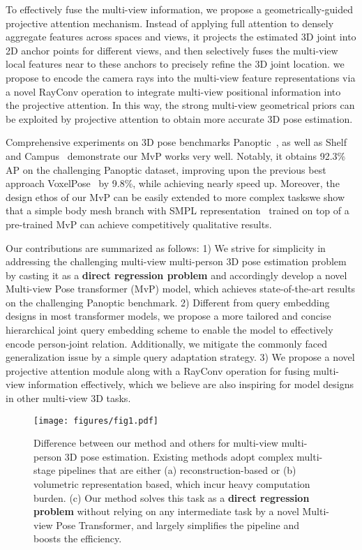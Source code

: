 \documentclass{article}
\begin{document}
To effectively fuse the multi-view information, we propose a geometrically-guided projective attention mechanism. Instead of applying full attention to densely aggregate features {across spaces and views},   
{it projects the estimated 3D  joint into 2D  anchor points for different views, and then selectively fuses the multi-view local features near to these anchors   to precisely refine the 3D joint location.}
we propose to encode the camera rays into the multi-view feature representations via a novel RayConv operation to integrate multi-view positional information into the projective attention. 
In this way, the strong multi-view geometrical priors can be exploited by projective attention to obtain more accurate 3D pose estimation.


Comprehensive experiments on 3D pose benchmarks Panoptic~\cite{joo2015panoptic}, as well as Shelf and Campus~\cite{belagiannis20143d} demonstrate our MvP works very well. 
{Notably, it obtains 92.3\% AP on the challenging Panoptic dataset, improving upon the previous best approach VoxelPose~\cite{Tu2020} by 9.8\%, while achieving nearly  speed up.}
Moreover, the design ethos of our MvP can be easily extended to more complex tasks\textemdash we show that a simple body mesh branch with SMPL representation~\cite{loper2015smpl} trained on top of a pre-trained MvP can achieve competitively qualitative results.

Our contributions are summarized as follows:
1) We strive for simplicity in addressing the challenging multi-view multi-person 3D pose estimation problem
by casting it as a \textbf{direct regression problem} and accordingly develop a novel Multi-view Pose transformer (MvP) model, which achieves state-of-the-art results on the challenging Panoptic benchmark.
2) Different from   query embedding designs in most transformer models, we propose a more tailored    and concise  hierarchical joint query embedding scheme to enable  the model to effectively encode person-joint relation. 
Additionally, we mitigate the commonly faced generalization issue by a simple query adaptation strategy.
3) We propose a novel projective attention module along with a RayConv operation for fusing multi-view information effectively, which we believe are also inspiring for model designs in other multi-view 3D tasks. 

\begin{figure}[t]
	\centering
	\texttt{[image: figures/fig1.pdf]}
	\caption{Difference between our method and others for multi-view multi-person 3D pose estimation. Existing methods adopt  complex multi-stage pipelines that are either (a) reconstruction-based or (b) volumetric representation based, which incur heavy computation burden. (c) Our method solves this task as a \textbf{direct regression problem} without relying on any intermediate task by a novel Multi-view Pose Transformer, and largely simplifies the pipeline and boosts the efficiency.}
	\label{fig:compare_to_others}
\end{figure}
\end{document}
